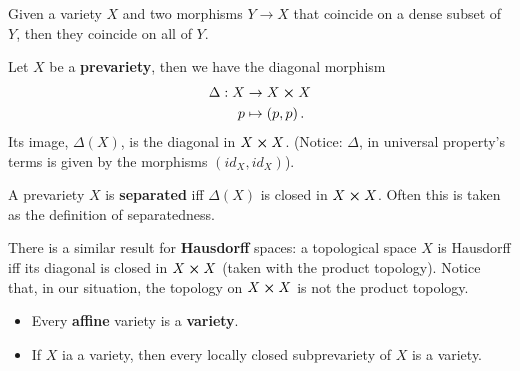 \begin{rem}
	Given a variety $X$ and two morphisms $Y\to X$ that coincide on a dense subset of $Y$, then they coincide on all of $Y$.
\end{rem}

\begin{defn}
	Let $X$ be a \textbf{prevariety}, then we have the diagonal morphism
	\begin{align}
		\Delta: X &\to X \cross X \\
		p &\mapsto \left(p, p\right)
	.\end{align} 
	Its image, $\Delta(X)$, is the diagonal in $X \cross X$.
	(Notice: $\Delta$, in universal property's terms is given by the morphisms $\left(id_X, id_X\right)$).
\end{defn}

\begin{lem}
	A prevariety $X$ is \textbf{separated} iff $\Delta(X)$ is closed in $X \cross X$.
	Often this is taken as the definition of separatedness.
\end{lem} 

\begin{rem}
	There is a similar result for \textbf{Hausdorff} spaces:
	a topological space $X$ is Hausdorff iff its diagonal is closed in $X \cross X$ (taken with the product topology).
	Notice that, in our situation, the topology on $X \cross X$ is not the product topology.
\end{rem}

\begin{lem}\leavevmode\vspace{-.2\baselineskip}
	\begin{itemize}
		\item Every \textbf{affine} variety is a \textbf{variety}.
		\item If $X$ ia a variety, then every locally closed subprevariety of $X$ is a variety.
	\end{itemize}
\end{lem} 
